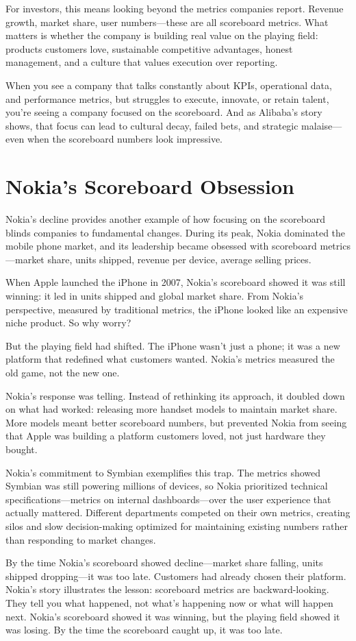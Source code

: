 For investors, this means looking beyond the metrics companies report. Revenue growth, market share, user numbers—these are all scoreboard metrics. What matters is whether the company is building real value on the playing field: products customers love, sustainable competitive advantages, honest management, and a culture that values execution over reporting.

When you see a company that talks constantly about KPIs, operational data, and performance metrics, but struggles to execute, innovate, or retain talent, you're seeing a company focused on the scoreboard. And as Alibaba's story shows, that focus can lead to cultural decay, failed bets, and strategic malaise—even when the scoreboard numbers look impressive.

\section{Nokia's Scoreboard Obsession}

Nokia's decline provides another example of how focusing on the scoreboard blinds companies to fundamental changes. During its peak, Nokia dominated the mobile phone market, and its leadership became obsessed with scoreboard metrics—market share, units shipped, revenue per device, average selling prices.

When Apple launched the iPhone in 2007, Nokia's scoreboard showed it was still winning: it led in units shipped and global market share. From Nokia's perspective, measured by traditional metrics, the iPhone looked like an expensive niche product. So why worry?

But the playing field had shifted. The iPhone wasn't just a phone; it was a new platform that redefined what customers wanted. Nokia's metrics measured the old game, not the new one.

Nokia's response was telling. Instead of rethinking its approach, it doubled down on what had worked: releasing more handset models to maintain market share. More models meant better scoreboard numbers, but prevented Nokia from seeing that Apple was building a platform customers loved, not just hardware they bought.

Nokia's commitment to Symbian exemplifies this trap. The metrics showed Symbian was still powering millions of devices, so Nokia prioritized technical specifications—metrics on internal dashboards—over the user experience that actually mattered. Different departments competed on their own metrics, creating silos and slow decision-making optimized for maintaining existing numbers rather than responding to market changes.

By the time Nokia's scoreboard showed decline—market share falling, units shipped dropping—it was too late. Customers had already chosen their platform. Nokia's story illustrates the lesson: scoreboard metrics are backward-looking. They tell you what happened, not what's happening now or what will happen next. Nokia's scoreboard showed it was winning, but the playing field showed it was losing. By the time the scoreboard caught up, it was too late.